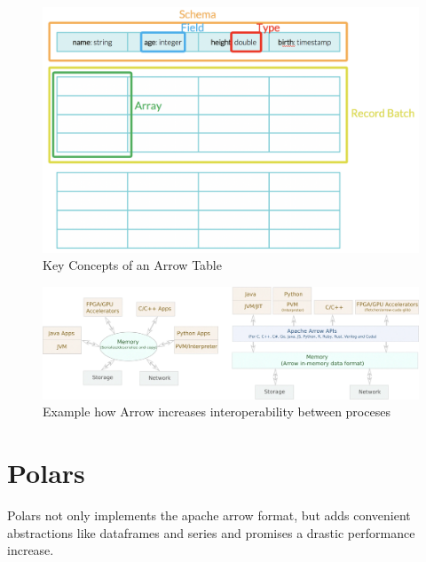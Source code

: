 \begin{figure}
	\includegraphics[width=\textwidth]{resources/arrow_tab}
	\caption{Key Concepts of an Arrow Table \autocite{Dremio}}
	\label{fig:arrow_tab}
\end{figure}
\begin{figure}
	\includegraphics[width=\textwidth]{resources/arrow_interop}
	\caption{Example how Arrow increases interoperability between proceses \autocite{Ahmad2020}}
	\label{fig:arrow_com}
\end{figure}




\section{Polars}
\label{section:polars}
Polars not only implements the apache arrow format, but adds convenient abstractions like dataframes and series and promises a drastic performance increase.

